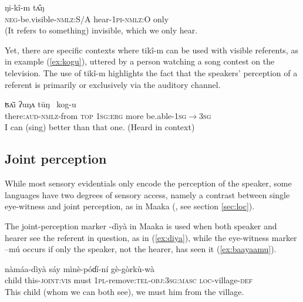 \documentclass[oneside,a4paper,11pt]{article}
\newcommand{\ipa}[1]{{\phon \mbox{#1}}} %
\begin{document}
\begin{exe}
\ex \label{ex:def}
\gll  	 	 \ipa{mu-toɔç-pɛ,} \ipa{ŋi-kî-m} \ipa{tʌ̂ŋ}   \\
\textsc{neg}-be.visible-\textsc{nmlz:S/A} hear-\textsc{1pi-nmlz:O} only  \\
\glt (It refers to something) invisible, which we only hear.
\end{exe}

Yet, there are specific contexts where \ipa{tikî-m}  can be used with visible referents, as in example  (\ref{ex:kogu}), uttered by a person watching a song contest on the television. The use of \ipa{tikî-m} highlights the  fact that the  speakers' perception of a referent is primarily or exclusively via the auditory channel.

\begin{exe}
\ex \label{ex:kogu}
\gll  	\ipa{tikî-m-kʌ}   	\ipa{ʦʌ̄i} \ipa{ʔuŋʌ} \ipa{tūŋ }   	\ipa{kog-u}   \\
there:\textsc{aud}-\textsc{nmlz}-from \textsc{top} \textsc{1sg:erg} more be.able-\textsc{1sg$\rightarrow$3sg}	  \\
\glt I can (sing) better than that one. (Heard in context)
\end{exe}

  

\subsection{Joint perception} \label{sec:joint}
While most sensory evidentials only encode the perception of the speaker, some languages have two degrees of sensory access, namely a contrast between single eye-witness and joint perception, as in Maaka (\citealt[195-7]{storch14maaka}, see section \ref{sec:loc}).

 The joint-perception marker \ipa{-dìyà} in Maaka is used when both speaker and hearer see the referent in question, as in (\ref{ex:diya}), while the eye-witness marker \ipa{--mú} occurs if only the speaker, not the hearer, has seen it (\ref{ex:baayaamu}).
 
 \begin{exe}
\ex \label{ex:diya}
\gll \ipa{làa} 	\ipa{nàmáa-dìyà} 	\ipa{sáy} 	\ipa{mìnè-póɗí-ní} 	\ipa{gè-gòrkù-wà}  \\
child this-\textsc{joint:vis} must \textsc{1pl}-remove:\textsc{tel-obj:3sg:masc} \textsc{loc}-village-\textsc{def} \\
\glt This child (whom we can both see), we must him from the village.
\end{exe}
\end{document}
